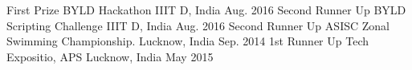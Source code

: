 \begin{cvhonors}
  \cvhonor
    {First Prize}
    {BYLD Hackathon}
    {IIIT D, India}
    {Aug. 2016}
  \cvhonor
    {Second Runner Up}
    {BYLD Scripting Challenge}
    {IIIT D, India}
    {Aug. 2016}
  \cvhonor
    {Second Runner Up}
    {ASISC Zonal Swimming Championship. }
    {Lucknow, India}
    {Sep. 2014}
  \cvhonor
    {1st Runner Up}
    {Tech Expositio, APS}
    {Lucknow, India}
    {May 2015}
\end{cvhonors}
